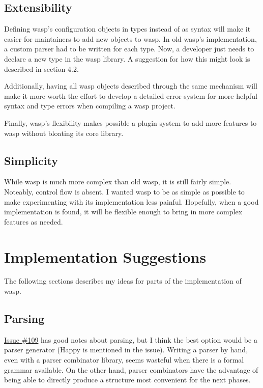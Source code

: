 \subsection{Extensibility}

Defining wasp's configuration objects in types instead of as syntax will make
it easier for maintainers to add new objects to wasp. In old wasp's
implementation, a custom parser had to be written for each type. Now, a
developer just needs to declare a new type in the wasp library. A suggestion
for how this might look is described in section 4.2.

Additionally, having all wasp objects described through the same mechanism will
make it more worth the effort to develop a detailed error system for more
helpful syntax and type errors when compiling a wasp project.

Finally, wasp's flexibility makes possible a plugin system to add more features
to wasp without bloating its core library.

\subsection{Simplicity}

While wasp is much more complex than old wasp, it is still fairly simple.
Noteably, control flow is absent. I wanted wasp to be as simple as possible
to make experimenting with its implementation less painful. Hopefully, when
a good implementation is found, it will be flexible enough to bring
in more complex features as needed.

\section{Implementation Suggestions}

The following sections describes my ideas for parts of the implementation of
wasp.

\subsection{Parsing}

\href{https://github.com/wasp-lang/wasp/issues/109}{Issue \#109} has good notes
about parsing, but I think the best option would be a parser generator (Happy
is mentioned in the issue). Writing a parser by hand, even with a parser
combinator library, seems wasteful when there is a formal grammar available.
On the other hand, parser combinators have the advantage of being able to
directly produce a structure most convenient for the next phases.

